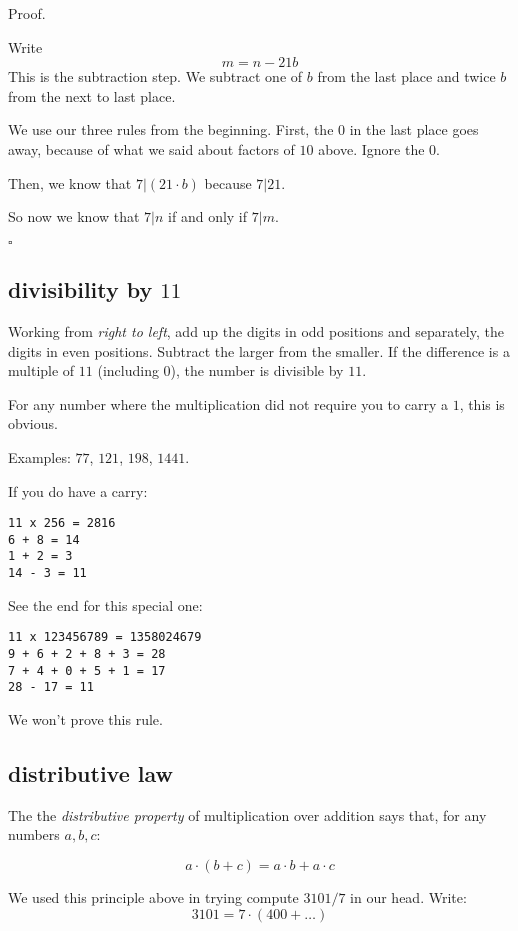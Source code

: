 \documentclass[11pt, oneside]{article}
\begin{document}
Proof.

Write
\[ m = n - 21b \]
This is the subtraction step.  We subtract one of $b$ from the last place and twice $b$ from the next to last place.  

We use our three rules from the beginning.  First, the $0$ in the last place goes away, because of what we said about factors of $10$ above.  Ignore the $0$.

Then, we know that $7|(21 \cdot b)$ because $7|21$.  

So now we know that $7|n$ if and only if $7|m$.

$\square$

\subsection*{divisibility by $11$}

Working from \emph{right to left}, add up the digits in odd positions and separately, the digits in even positions.  Subtract the larger from the smaller.  If the difference is a multiple of $11$ (including $0$), the number is divisible by $11$.

For any number where the multiplication did not require you to carry a $1$, this is obvious.

Examples:  $77$, $121$, $198$, $1441$.

If you do have a carry:

\begin{verbatim}
11 x 256 = 2816
6 + 8 = 14
1 + 2 = 3
14 - 3 = 11
\end{verbatim}

See the end for this special one:

\begin{verbatim}
11 x 123456789 = 1358024679
9 + 6 + 2 + 8 + 3 = 28
7 + 4 + 0 + 5 + 1 = 17
28 - 17 = 11
\end{verbatim}

We won't prove this rule.

\subsection*{distributive law}

The the \emph{distributive property} of multiplication over addition says that, for any numbers $a,b,c$:

\[ a \cdot (b+c) = a \cdot b + a \cdot c \]

We used this principle above in trying compute $3101/7$ in our head.  Write:
\[ 3101 = 7 \cdot (400 + \dots) \]
\end{document}
